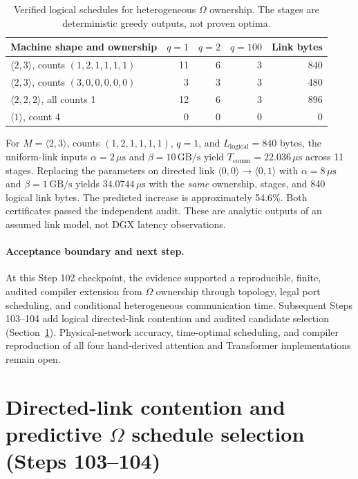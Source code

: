 \documentclass[11pt]{article}
\begin{document}
\begin{table}[htbp]\centering\small
\caption{Verified logical schedules for heterogeneous $\Omega$ ownership.
The stages are deterministic greedy outputs, not proven optima.}
\label{tab:nov39-schedules}
\begin{tabular}{lrrrr}\toprule
Machine shape and ownership & $q=1$ & $q=2$ & $q=100$ & Link bytes\\\midrule
$\langle2,3\rangle$, counts $(1,2,1,1,1,1)$ & 11 & 6 & 3 & 840\\
$\langle2,3\rangle$, counts $(3,0,0,0,0,0)$ & 3 & 3 & 3 & 480\\
$\langle2,2,2\rangle$, all counts 1 & 12 & 6 & 3 & 896\\
$\langle1\rangle$, count 4 & 0 & 0 & 0 & 0\\\bottomrule
\end{tabular}
\end{table}

For $M=\langle2,3\rangle$, counts $(1,2,1,1,1,1)$,
$q=1$, and $L_{\mathrm{logical}}=840$ bytes, the uniform-link inputs
$\alpha=2\,\mu\mathrm{s}$ and $\beta=10\,\mathrm{GB/s}$ yield
$T_{\mathrm{comm}}=22.036\,\mu\mathrm{s}$ across 11 stages.
Replacing the parameters on directed link
$\langle0,0\rangle\rightarrow\langle0,1\rangle$ with
$\alpha=8\,\mu\mathrm{s}$ and $\beta=1\,\mathrm{GB/s}$ yields
$34.0744\,\mu\mathrm{s}$ with the \emph{same} ownership, stages, and
840 logical link bytes. The predicted increase is approximately 54.6\%.
Both certificates passed the independent audit. These are analytic
outputs of an assumed link model, not DGX latency observations.

\paragraph{Acceptance boundary and next step.}
At this Step 102 checkpoint, the evidence supported a reproducible, finite,
audited compiler extension from $\Omega$ ownership through topology, legal
port scheduling, and conditional heterogeneous communication time. Subsequent
Steps 103--104 add logical directed-link contention and audited candidate
selection (Section~\ref{sec:nov-contention-selection}). Physical-network
accuracy, time-optimal scheduling, and compiler reproduction of all four
hand-derived attention and Transformer implementations remain open.


\clearpage
\section{Directed-link contention and predictive $\Omega$ schedule selection (Steps 103--104)}
\label{sec:nov-contention-selection}
\end{document}
